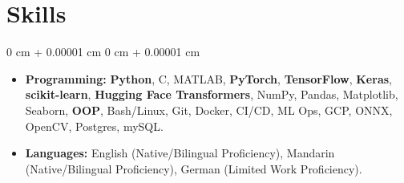 \documentclass[10pt, letterpaper]{article}
\newenvironment{highlights}{
    \begin{itemize}[
        topsep=0.10 cm,
        parsep=0.10 cm,
        partopsep=0pt,
        itemsep=0pt,
        leftmargin=0 cm + 10pt
    ]
}{
    \end{itemize}
}
\newenvironment{onecolentry}{
    \begin{adjustwidth}{
        0 cm + 0.00001 cm
    }{
        0 cm + 0.00001 cm
    }
}{
    \end{adjustwidth}
}
\begin{document}
\section{Skills}
\begin{onecolentry}
    \begin{highlights}
        \item \textbf{Programming:} \textbf{Python}, C, MATLAB, \textbf{PyTorch}, \textbf{TensorFlow}, \textbf{Keras}, \textbf{scikit-learn}, \textbf{Hugging Face Transformers}, NumPy, Pandas, Matplotlib, Seaborn, \textbf{OOP}, Bash/Linux, Git, Docker, CI/CD, ML Ops, GCP, ONNX, OpenCV, Postgres, mySQL.

        \item \textbf{Languages:} English (Native/Bilingual Proficiency), Mandarin (Native/Bilingual Proficiency), German (Limited Work Proficiency).
    \end{highlights}
\end{onecolentry}
\end{document}
